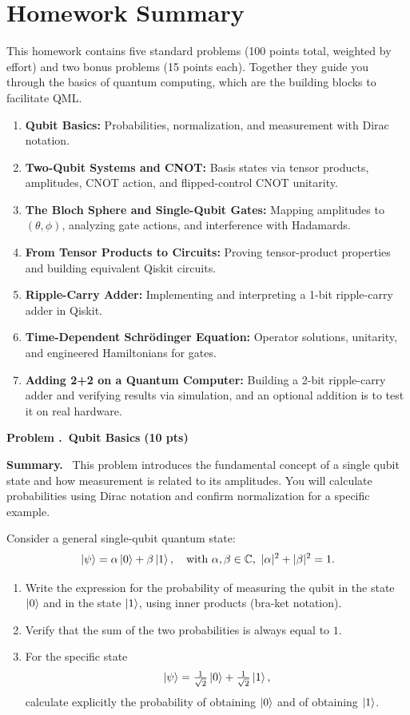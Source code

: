 \documentclass[11pt]{article}
\newcommand{\pts}[1]{\hfill{\small\bfseries(#1 pts)}}
\newenvironment{summary}{\vspace{2pt}\noindent\textbf{Summary.}~}{\par\vspace{6pt}}
\newcounter{problem}
\newcommand{\problem}[2]{%
  \refstepcounter{problem}
  \vspace{10pt}\noindent\textbf{Problem \theproblem.~#1} \pts{#2}\par
}
\newcounter{bonus}
\begin{document}
\section*{Homework Summary}
This homework contains five standard problems (100 points total, weighted by effort) and two bonus problems (15 points each). Together they guide you through the basics of quantum computing, which are the building blocks to facilitate QML.

\begin{enumerate}
  \item \textbf{Qubit Basics:} Probabilities, normalization, and measurement with Dirac notation.
  \item \textbf{Two-Qubit Systems and CNOT:} Basis states via tensor products, amplitudes, CNOT action, and flipped-control CNOT unitarity.
  \item \textbf{The Bloch Sphere and Single-Qubit Gates:} Mapping amplitudes to $(\theta,\phi)$, analyzing gate actions, and interference with Hadamards.
  \item \textbf{From Tensor Products to Circuits:} Proving tensor-product properties and building equivalent Qiskit circuits.
  \item \textbf{Ripple-Carry Adder:} Implementing and interpreting a 1-bit ripple-carry adder in Qiskit.
  \item[\textbf{Bonus A.}] \textbf{Time-Dependent Schr\"odinger Equation:} Operator solutions, unitarity, and engineered Hamiltonians for gates.
  \item[\textbf{Bonus B.}] \textbf{Adding 2+2 on a Quantum Computer:} Building a 2-bit ripple-carry adder and verifying results via simulation, and an optional addition is to test it on real hardware.
\end{enumerate}

\problem{Qubit Basics}{10}
\begin{summary}
This problem introduces the fundamental concept of a single qubit state and how measurement is related to its amplitudes. You will calculate probabilities using Dirac notation and confirm normalization for a specific example.
\end{summary}

Consider a general single-qubit quantum state:
\[
\ket{\psi} = \alpha \ket{0} + \beta \ket{1}, \quad \text{with } \alpha, \beta \in \mathbb{C}, \ |\alpha|^2 + |\beta|^2 = 1.
\]

\begin{enumerate}[label=(\alph*)]
  \item Write the expression for the probability of measuring the qubit in the state $\ket{0}$ and in the state $\ket{1}$, using inner products (bra-ket notation).
  \item Verify that the sum of the two probabilities is always equal to $1$.
  \item For the specific state 
  \[
  \ket{\psi} = \tfrac{1}{\sqrt{2}}\ket{0} + \tfrac{1}{\sqrt{2}}\ket{1},
  \]
  calculate explicitly the probability of obtaining $\ket{0}$ and of obtaining $\ket{1}$.
\end{enumerate}
\end{document}

